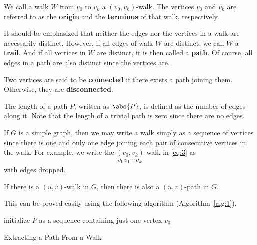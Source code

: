 \documentclass[thmcnt=section, 12pt, color=cyan]{my-elegantbook}
\begin{document}
We call a walk $W$ from $v_0$ to $v_k$ a $(v_0, v_k)$-walk. The vertices $v_0$ and $v_k$ are referred to as the \textbf{origin} and the \textbf{terminus} of that walk, respectively. 

It should be emphasized that neither the edges nor the vertices in a walk are necessarily distinct. However, if all edges of walk $W$ are distinct, we call $W$ a \textbf{trail}. And if all vertices in $W$ are distinct, it is then called a \textbf{path}. Of course, all edges in a path are also distinct since the vertices are.

Two vertices are said to be \textbf{connected} if there exists a path joining them. Otherwise, they are \textbf{disconnected}. 

The length of a path $P$, written as $\abs{P}$, is defined as the number of edges along it. Note that the length of a trivial path is zero since there are no edges.

If $G$ is a simple graph, then we may write a walk simply as a sequence of vertices since there is one and only one edge joining each pair of consecutive vertices in the walk. For example, we write the $(v_0, v_k)$-walk in \eqref{eq:3} as 
\begin{align*}
    v_0 v_1 \cdots v_k
\end{align*}
with edges dropped.


\begin{proposition} \label{pro:7}
    If there is a $(u, v)$-walk in $G$, then there is also a $(u, v)$-path in $G$.
\end{proposition}

This can be proved easily using the following algorithm (Algorithm~\ref{alg:1}).

\begin{algorithm}[ht]
    initialize $P$ as a sequence containing just one vertex $v_0$ \;
    \caption{Extracting a Path From a Walk}
    \label{alg:1}
\end{algorithm}

\end{document}

